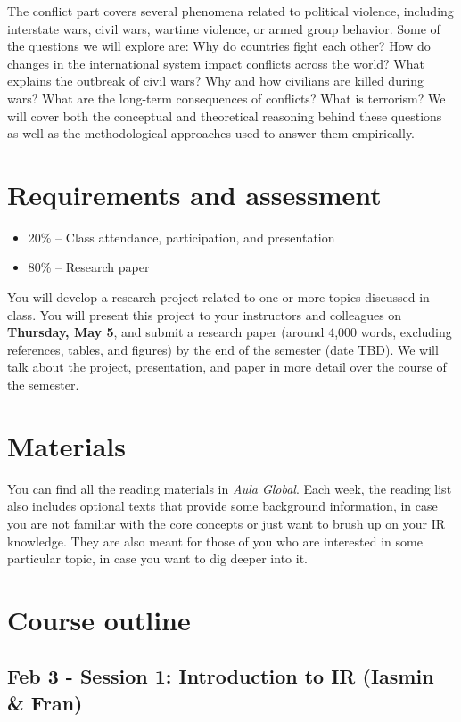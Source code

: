 \documentclass[12pt, a4paper]{article}
\begin{document}
The conflict part covers several phenomena related to political violence, including interstate wars, civil wars, wartime violence, or armed group behavior. Some of the questions we will explore are: Why do countries fight each other? How do changes in the international system impact conflicts across the world? What explains the outbreak of civil wars? Why and how civilians are killed during wars? What are the long-term consequences of conflicts? What is terrorism? We will cover both the conceptual and theoretical reasoning behind these questions as well as the methodological approaches used to answer them empirically.

\section{Requirements and assessment}

\begin{itemize}
\item 20\% -- Class attendance, participation, and presentation
\item 80\% -- Research paper
\end{itemize}

You will develop a research project related to one or more topics discussed in class. You will present this project to your instructors and colleagues on \textbf{Thursday, May 5}, and submit a research paper (around 4,000 words, excluding references, tables, and figures) by the end of the semester (date TBD). We will talk about the project, presentation, and paper in more detail over the course of the semester.

\section{Materials}

You can find all the reading materials in \textit{Aula Global}.
Each week, the reading list also includes optional texts that provide some background information, in case you are not familiar with the core concepts or just want to brush up on your IR knowledge.
They are also meant for those of you who are interested in some particular topic, in case you want to dig deeper into it.

\section{Course outline}

\subsection*{Feb 3 - Session 1: Introduction to IR (Iasmin \& Fran)}
\end{document}
